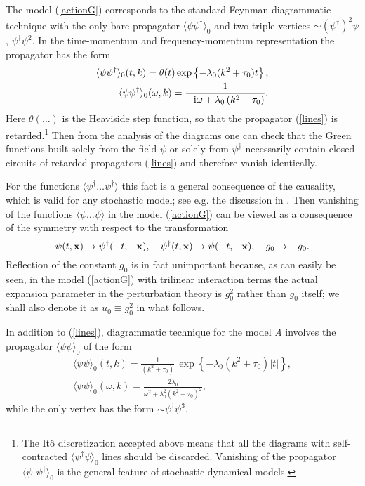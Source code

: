 \documentclass[12pt]{iopart}
\begin{document}
The model (\ref{actionG}) corresponds to the standard Feynman
diagrammatic technique with the only bare propagator
$\langle \psi \psi^{\dag} \rangle_{0}$ and two triple vertices
$\sim (\psi^{\dagger})^2\psi$, $\psi^{\dagger}\psi^2$.
In the time-momentum and frequency-momentum representation the propagator
has the form
\begin{eqnarray}
\langle \psi \psi^{\dag} \rangle_{0}(t,k) =
\theta(t) \exp \left\{ - \lambda_{0}
(k^{2}+\tau_{0}) t \right\}, \nonumber \\
\langle \psi \psi^{\dag} \rangle_{0} (\omega,k) =
\frac{1}{-{\rm i}\omega+\lambda_{0} \left(k^{2}+\tau_{0}\right)}.
\label{lines}
\end{eqnarray}
Here $\theta(\dots)$ is the Heaviside step function, so that the propagator
(\ref{lines}) is retarded.\footnote{The It\^{o} discretization
accepted above means that all the diagrams with self-contracted
$\langle \psi^{\dag} \psi \rangle_{0}$ lines should be discarded.
Vanishing of the propagator $\langle \psi^{\dag} \psi^{\dag} \rangle_{0}$
is the general feature of stochastic dynamical models.}
Then from the analysis of the diagrams one can
check that the Green functions built solely from the field $\psi$
or solely from $\psi^{\dag}$ necessarily contain closed circuits of
retarded propagators (\ref{lines}) and therefore vanish identically.

For the functions $\langle \psi^{\dag} \dots \psi^{\dag} \rangle$ this
fact is a general consequence of the causality, which is valid
for any stochastic model; see e.g. the discussion in \cite{Book3}.
Then vanishing of the functions $\langle \psi \dots \psi \rangle$
in the model (\ref{actionG}) can be viewed as a consequence of the
symmetry with respect to the transformation
\begin{equation}
\psi(t,{\bf x})\to \psi^{\dagger}(-t,-{\bf x}),
\quad \psi^{\dagger}(t,{\bf x})\to \psi(-t,-{\bf x}),
\quad g_{0}\to -g_{0}.
\label{symm}
\end{equation}
Reflection of the constant $g_{0}$ is in fact unimportant because, as can
easily be seen, in the model (\ref{actionG}) with trilinear interaction
terms the actual expansion parameter in the perturbation theory is
$g_{0}^{2}$ rather than $g_{0}$ itself; we shall also denote it as
$u_{0}\equiv g_{0}^{2}$ in what follows.

In addition to (\ref{lines}), diagrammatic technique for the model {\it A}
involves the propagator $\langle \psi \psi \rangle_{0}$ of the form
\begin{eqnarray}
\langle \psi \psi \rangle_{0}(t,k) = \frac{1}{(k^{2}+\tau_{0})}\,
\exp \left\{ - \lambda_{0} (k^{2}+\tau_{0})|t| \right\},
\nonumber \\
\langle \psi \psi \rangle_{0}(\omega,k) = \frac{2\lambda_{0}}
{\omega^{2} + \lambda_{0}^{2} (k^{2}+\tau_{0})^{2}},
\label{lines2}
\end{eqnarray}
while the only vertex has the form $\sim \psi^{\dagger}\psi^{3}$.
\end{document}
